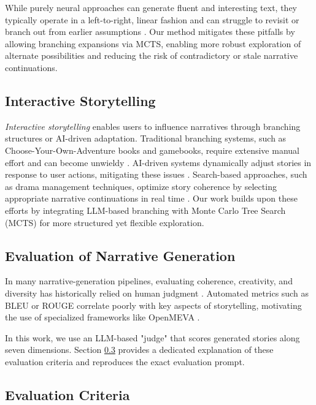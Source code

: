 \documentclass[11pt]{article}
\begin{document}
While purely neural approaches can generate fluent and interesting text, they typically operate in a left-to-right, linear fashion and can struggle to revisit or branch out from earlier assumptions \citep{yang2024makesgoodstorymeasure}. Our method mitigates these pitfalls by allowing branching expansions via MCTS, enabling more robust exploration of alternate possibilities and reducing the risk of contradictory or stale narrative continuations.

\subsection{Interactive Storytelling}
\textit{Interactive storytelling} enables users to influence narratives through branching structures or AI-driven adaptation. Traditional branching systems, such as Choose-Your-Own-Adventure books and gamebooks, require extensive manual effort and can become unwieldy \citep{young2013narrative}. AI-driven systems dynamically adjust stories in response to user actions, mitigating these issues \citep{mateas2003facade, riedl2016interactive}. Search-based approaches, such as drama management techniques, optimize story coherence by selecting appropriate narrative continuations in real time \citep{jhala2011cinematic}. Our work builds upon these efforts by integrating LLM-based branching with Monte Carlo Tree Search (MCTS) for more structured yet flexible exploration.

\subsection{Evaluation of Narrative Generation}
In many narrative-generation pipelines, evaluating coherence, creativity, and diversity has historically relied on human judgment \citep{chakrabarty2023creativity, guan2021openmeva}. Automated metrics such as BLEU or ROUGE correlate poorly with key aspects of storytelling, motivating the use of specialized frameworks like OpenMEVA \citep{guan2021openmeva}. 

In this work, we use an LLM-based "judge" that scores generated stories along seven dimensions. Section \ref{sec:evaluation_criteria} provides a dedicated explanation of these evaluation criteria and reproduces the exact evaluation prompt.

\subsection{Evaluation Criteria}\label{sec:evaluation_criteria}
\end{document}
